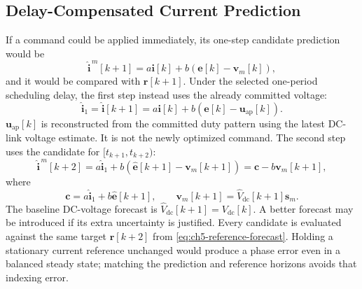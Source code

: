 \subsection{Delay-Compensated Current Prediction}
If a command could be applied immediately, its one-step candidate prediction would be
\begin{equation}
\widehat{\mathbf i}^{\,m}[k+1]=a\mathbf i[k]+b(\mathbf e[k]-\mathbf v_m[k]),
\label{eq:ch5-one-step}
\end{equation}
and it would be compared with $\mathbf r[k+1]$. Under the selected one-period scheduling delay, the first step instead uses the already committed voltage:
\begin{equation}
\widehat{\mathbf i}_1=\widehat{\mathbf i}[k+1]
=a\mathbf i[k]+b(\mathbf e[k]-\mathbf u_{\mathrm{ap}}[k]).
\label{eq:ch5-delay-step}
\end{equation}
$\mathbf u_{\mathrm{ap}}[k]$ is reconstructed from the committed duty pattern using the latest DC-link voltage estimate. It is not the newly optimized command. The second step uses the candidate for $[t_{k+1},t_{k+2})$:
\begin{equation}
\widehat{\mathbf i}^{\,m}[k+2]
=a\widehat{\mathbf i}_1+b(\widehat{\mathbf e}[k+1]-\mathbf v_m[k+1])
=\mathbf c-b\mathbf v_m[k+1],
\label{eq:ch5-two-step}
\end{equation}
where
\begin{equation}
\mathbf c=a\widehat{\mathbf i}_1+b\widehat{\mathbf e}[k+1],\qquad
\mathbf v_m[k+1]=\widehat V_{\mathrm{dc}}[k+1]\mathbf s_m.
\label{eq:ch5-base-prediction}
\end{equation}
The baseline DC-voltage forecast is $\widehat V_{\mathrm{dc}}[k+1]=V_{\mathrm{dc}}[k]$. A better forecast may be introduced if its extra uncertainty is justified. Every candidate is evaluated against the same target $\mathbf r[k+2]$ from \eqref{eq:ch5-reference-forecast}. Holding a stationary current reference unchanged would produce a phase error even in a balanced steady state; matching the prediction and reference horizons avoids that indexing error.

